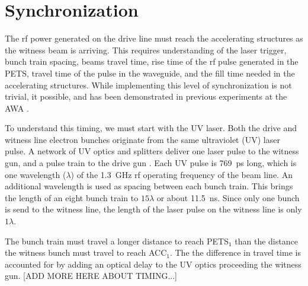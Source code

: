 \documentclass[letterpaper,  %
              ]{jacow-2_3}   %
\begin{document}
\section{Synchronization}
The rf power generated on the drive line
must reach the accelerating structures as the witness beam is arriving.
This requires understanding of the laser trigger, 
bunch train spacing, beams travel time, 
rise time of the rf pulse generated in the PETS, 
travel time of the pulse in the waveguide, and 
the fill time needed in the accelerating structures. 
While implementing this level of synchronization is not trivial, 
it possible, and has been demonstrated in previous experiments
at the AWA \cite{tba}. 

To understand this timing, we must start with the UV laser.
Both the drive and witness line electron bunches
originate from the same ultraviolet (UV) laser pulse. 
A network of UV optics and splitters deliver one laser 
pulse to the witness gun, and a pulse train to the drive gun \cite{korea}.
Each UV pulse is \SI{769}{ps} long, which is one wavelength ($\lambda$)
of the \SI{1.3}{GHz} rf operating frequency of the beam line.  
An additional wavelength is used as spacing between each bunch train.
This brings the length of an eight bunch train to $15\lambda$ or about \SI{11.5}{ns}.
Since only one bunch is send to the witness line, the length of the 
laser pulse on the witness line is only $1\lambda$.

The bunch train must travel a longer distance to reach PETS$_1$ 
than the distance the witness bunch must travel to reach ACC$_1$.
The the difference in travel time is accounted for by adding an optical delay 
to the UV optics proceeding the witness gun. 
[ADD MORE HERE ABOUT TIMING...]
\end{document}
